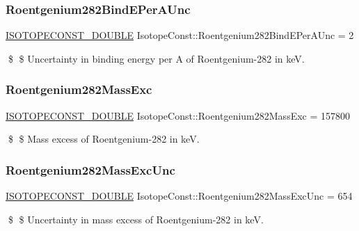 \subsubsection{\texorpdfstring{Roentgenium282\+Bind\+E\+Per\+A\+Unc}{Roentgenium282BindEPerAUnc}}
{\footnotesize\ttfamily \mbox{\hyperlink{group___isotope_const-_macros_ga8f45a7272ce02c0b4c65c44636ed719a}{I\+S\+O\+T\+O\+P\+E\+C\+O\+N\+S\+T\+\_\+\+D\+O\+U\+B\+LE}} Isotope\+Const\+::\+Roentgenium282\+Bind\+E\+Per\+A\+Unc = 2}

\$ \$ Uncertainty in binding energy per A of Roentgenium-\/282 in keV. \mbox{\label{group___isotope_const-_roentgenium-_rg282_ga040203415742ef11805ac484ff36dabd}} 
\subsubsection{\texorpdfstring{Roentgenium282\+Mass\+Exc}{Roentgenium282MassExc}}
{\footnotesize\ttfamily \mbox{\hyperlink{group___isotope_const-_macros_ga8f45a7272ce02c0b4c65c44636ed719a}{I\+S\+O\+T\+O\+P\+E\+C\+O\+N\+S\+T\+\_\+\+D\+O\+U\+B\+LE}} Isotope\+Const\+::\+Roentgenium282\+Mass\+Exc = 157800}

\$ \$ Mass excess of Roentgenium-\/282 in keV. \mbox{\label{group___isotope_const-_roentgenium-_rg282_ga269d7ab722f0da7abe1c2f0f718e8d9f}} 
\subsubsection{\texorpdfstring{Roentgenium282\+Mass\+Exc\+Unc}{Roentgenium282MassExcUnc}}
{\footnotesize\ttfamily \mbox{\hyperlink{group___isotope_const-_macros_ga8f45a7272ce02c0b4c65c44636ed719a}{I\+S\+O\+T\+O\+P\+E\+C\+O\+N\+S\+T\+\_\+\+D\+O\+U\+B\+LE}} Isotope\+Const\+::\+Roentgenium282\+Mass\+Exc\+Unc = 654}

\$ \$ Uncertainty in mass excess of Roentgenium-\/282 in keV. \mbox{\label{group___isotope_const-_roentgenium-_rg282_ga2e24b6236c31893f517e96e1aba336b0}} 
